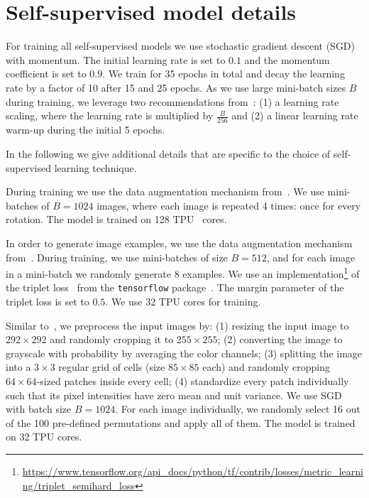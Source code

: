 \documentclass[10pt,twocolumn,letterpaper]{article}
\newcommand{\PAR}[1]{\vskip4pt \noindent {\bf #1~}}
\begin{document}
\section{Self-supervised model details}

For training all self-supervised models we use stochastic gradient descent (SGD) with momentum.
The initial learning rate is set to $0.1$ and the momentum coefficient is set to $0.9$.
We train for 35 epochs in total and decay the learning rate by a factor of 10 after 15 and 25 epochs.
As we use large mini-batch sizes $B$ during training, we leverage two recommendations from~\cite{goyal2017accurate}:
(1) a learning rate scaling, where the learning rate is multiplied by
$\frac{B}{256}$
and (2) a linear learning rate warm-up during the initial 5 epochs.

In the following we give additional details that are specific to the choice of self-supervised learning technique.

\PAR{Rotation:} During training we use the data augmentation mechanism from~\cite{szegedy2015going}. 
We use mini-batches of $B=1024$ images, where each image is repeated 4 times: once for every rotation. 
The model is trained on 128 TPU~\cite{jouppi2017datacenter} cores.

\PAR{Exemplar:} In order to generate image examples, we use the data augmentation mechanism from~\cite{szegedy2015going}.
During training, we use mini-batches of size $B=512$, and
for each image in a mini-batch we randomly generate 8 examples.
We use an implementation\footnote{\url{https://www.tensorflow.org/api_docs/python/tf/contrib/losses/metric_learning/triplet_semihard_loss}} of the triplet loss~\cite{schroff2015facenet} from the \texttt{tensorflow} package~\cite{abadi2016tensorflow}.
The margin parameter of the triplet loss is set to $0.5$.
We use 32 TPU cores for training.

\PAR{Jigsaw:} Similar to~\cite{noroozi2016unsupervised}, we preprocess the input images by:
(1) resizing the input image to $292 \times 292$ and randomly cropping it to $255 \times 255$;
(2) converting the image to grayscale with probability  by averaging the color channels;
(3) splitting the image into a $3 \times 3$ regular grid of cells (size $85 \times 85$ each) and randomly cropping $64 \times 64$-sized patches inside every cell; 
(4) standardize every patch individually such that its pixel intensities have zero mean and unit variance.
We use SGD with batch size $B=1024$.
For each image individually, we randomly select 16 out of the 100 pre-defined permutations and apply all of them.
The model is trained on 32 TPU cores.
\end{document}
